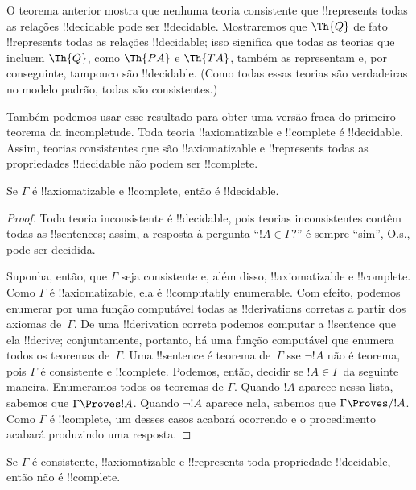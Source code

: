\documentclass[../../../include/open-logic-section]{subfiles}
\begin{document}
\begin{explain}
O teorema anterior mostra que nenhuma teoria consistente que
!!{represents} todas as relações !!{decidable} pode ser !!{decidable}.
Mostraremos que $\Th{Q}$ de fato !!{represents} todas as relações
!!{decidable}; isso significa que todas as teorias que incluem
$\Th{Q}$, como $\Th{PA}$ e $\Th{TA}$, também as representam e, por
conseguinte, tampouco são !!{decidable}. (Como todas essas teorias são
verdadeiras no modelo padrão, todas são consistentes.)

Também podemos usar esse resultado para obter uma versão fraca do
primeiro teorema da incompletude. Toda teoria !!{axiomatizable} e
!!{complete} é !!{decidable}. Assim, teorias consistentes que são
!!{axiomatizable} e !!{represents} todas as propriedades !!{decidable}
não podem ser !!{complete}.
\end{explain}

\begin{thm}
Se $\Gamma$ é !!{axiomatizable} e !!{complete}, então é !!{decidable}.
\end{thm}

\begin{proof}
Toda teoria inconsistente é !!{decidable}, pois teorias inconsistentes
contêm todas as !!{sentence}s; assim, a resposta à pergunta ``$!A \in
\Gamma$?'' é sempre ``sim'', O.s.\@, pode ser decidida.

Suponha, então, que $\Gamma$ seja consistente e, além disso,
!!{axiomatizable} e !!{complete}. Como $\Gamma$ é !!{axiomatizable},
ela é !!{computably enumerable}. Com efeito, podemos enumerar por uma
função computável todas as !!{derivation}s corretas a partir dos
axiomas de~$\Gamma$. De uma !!{derivation} correta podemos computar a
!!{sentence} que ela !!{derive}; conjuntamente, portanto, há uma função
computável que enumera todos os teoremas de~$\Gamma$. Uma !!{sentence}
é teorema de~$\Gamma$ sse $\lnot !A$ não é teorema, pois $\Gamma$
é consistente e !!{complete}. Podemos, então, decidir se
$!A \in \Gamma$ da seguinte maneira. Enumeramos todos os teoremas de
$\Gamma$. Quando $!A$ aparece nessa lista, sabemos que
$\Gamma \Proves !A$. Quando $\lnot !A$ aparece nela, sabemos que
$\Gamma \Proves/ !A$. Como $\Gamma$ é !!{complete}, um desses casos
acabará ocorrendo e o procedimento acabará produzindo uma resposta.
\end{proof}

\begin{cor}
Se $\Gamma$ é consistente, !!{axiomatizable} e !!{represents} toda
propriedade !!{decidable}, então não é !!{complete}.
\end{cor}
\end{document}
